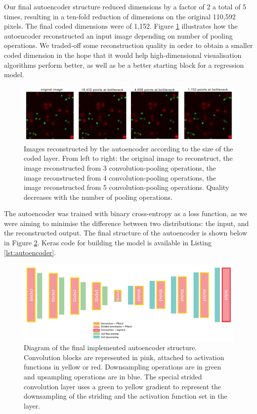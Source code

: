 Our final autoencoder structure reduced dimensions by a factor of 2 a total of 5 times, resulting in a ten-fold reduction of dimensions on the original 110,592 pixels. The final coded dimensions were of 1,152. Figure \ref{fig:diff_reconstructions} illustrates how the autoencoder reconstructed an input image depending on number of pooling operations. We traded-off some reconstruction quality in order to obtain a smaller coded dimension in the hope that it would help high-dimensional visualisation algorithms perform better, as well as be a better starting block for a regression model. 

\begin{figure}[h]
    \centering
    \includegraphics[width=.95\textwidth]{dissertation/figures/reduction_trade_off.png}
    \caption{Images reconstructed by the autoencoder according to the size of the coded layer. From left to right: the original image to reconstruct, the image reconstructed from 3 convolution-pooling operations, the image reconstructed from 4 convolution-pooling operations, the image reconstructed from 5 convolution-pooling operations. Quality decreases with the number of pooling operations.}
    \label{fig:diff_reconstructions}
\end{figure}

The autoencoder was trained with binary cross-entropy as a loss function, as we were aiming to minimise the difference between two distributions: the input, and the reconstructed output. The final structure of the autoencoder is shown below in Figure \ref{fig:autoencoder_details}. Keras code for building the model is available in Listing \ref{lst:autoencoder}. 

\begin{figure}[h]
    \centering
    \includegraphics[width=.9\textwidth]{dissertation/figures/autoencoder_final_structure.png}
    \caption{Diagram of the final implemented autoencoder structure. Convolution blocks are represented in pink, attached to activation functions in yellow or red. Downsampling operations are in green and upsampling operations are in blue. The special strided convolution layer uses a green to yellow gradient to represent the downsampling of the striding and the activation function set in the layer.}
    \label{fig:autoencoder_details}
\end{figure}

